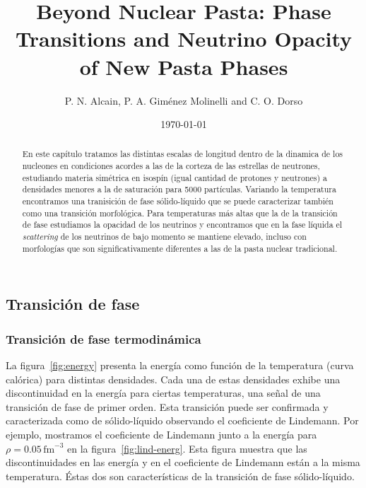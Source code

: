 \documentclass[twocolumn,showpacs]{revtex4-1}
\begin{document}
\title[Beyond Nuclear Pasta]{Beyond Nuclear Pasta: Phase Transitions
  and Neutrino Opacity of New Pasta Phases}

\author{P. N. Alcain, P. A. Gim\'enez Molinelli and C. O. Dorso}


\date{\today} 

\begin{abstract}
En este capítulo tratamos las distintas escalas de longitud dentro de
la dinamica de los nucleones en condiciones acordes a las de la corteza de las estrellas de neutrones, estudiando materia simétrica en isospín (igual cantidad de protones y neutrones) a densidades menores a la de saturación para 5000 partículas.
Variando la temperatura encontramos una tranisición de fase sólido-líquido que se puede caracterizar también como una transición morfológica.
Para temperaturas más altas que la de la transición de fase estudiamos la opacidad de los neutrinos y encontramos que en la fase líquida el \emph{scattering} de los neutrinos de bajo momento se mantiene elevado, incluso con morfologías que son significativamente diferentes a las de la pasta nuclear tradicional.\end{abstract}

\maketitle

\subsection{Transición de fase}
\subsubsection{Transición de fase termodinámica}

La figura~\ref{fig:energy} presenta la energía como función de la temperatura (curva calórica) para distintas densidades.
Cada una de estas densidades exhibe una discontinuidad en la energía para ciertas temperaturas, una señal de una transición de fase de primer orden.
Esta transición puede ser confirmada y caracterizada como de sólido-líquido observando el coeficiente de Lindemann. Por ejemplo, mostramos el coeficiente de Lindemann junto a la energía para $\rho=0.05\,\text{fm}^{-3}$ en la figura~\ref{fig:lind-energ}.
Esta figura muestra que las discontinuidades en las energía y en el coeficiente de Lindemann están a la misma temperatura.
Éstas dos son características de la transición de fase sólido-líquido.
\end{document}
